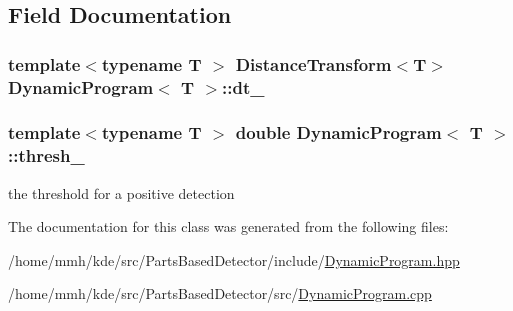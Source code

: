 \subsection{Field Documentation}
\hypertarget{classDynamicProgram_a6cea0b8559d6a03d81e2003991ab67cf}{
\subsubsection[{dt\-\_\-}]{\setlength{\rightskip}{0pt plus 5cm}template$<$typename T $>$ {\bf Distance\-Transform}$<$T$>$ {\bf Dynamic\-Program}$<$ T $>$\-::dt\-\_\-\hspace{0.3cm}{\ttfamily [private]}}}\label{classDynamicProgram_a6cea0b8559d6a03d81e2003991ab67cf}
\hypertarget{classDynamicProgram_a08f2d4801faa0f964e217b9ac9927ec6}{
\subsubsection[{thresh\-\_\-}]{\setlength{\rightskip}{0pt plus 5cm}template$<$typename T $>$ double {\bf Dynamic\-Program}$<$ T $>$\-::thresh\-\_\-\hspace{0.3cm}{\ttfamily [private]}}}\label{classDynamicProgram_a08f2d4801faa0f964e217b9ac9927ec6}


the threshold for a positive detection 



The documentation for this class was generated from the following files\-:\begin{DoxyCompactItemize}
\item 
/home/mmh/kde/src/\-Parts\-Based\-Detector/include/\hyperlink{DynamicProgram_8hpp}{Dynamic\-Program.\-hpp}\item 
/home/mmh/kde/src/\-Parts\-Based\-Detector/src/\hyperlink{DynamicProgram_8cpp}{Dynamic\-Program.\-cpp}\end{DoxyCompactItemize}
